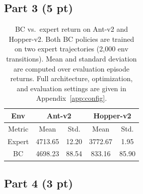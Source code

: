 \documentclass{article}
\begin{document}
\subsection{Part 3 (5 pt)}
\begin{table}[htbp]
  \centering

  \begin{tabular}{ccccc}
    \toprule
    Env & \multicolumn{2}{c}{Ant-v2} & \multicolumn{2}{c}{Hopper-v2} \\
    \midrule
    Metric & Mean & Std. & Mean & Std. \\
    Expert & 4713.65 & 12.20 & 3772.67 & 1.95 \\
    BC & 4698.23 & 88.54 & 833.16 & 85.90 \\
    \bottomrule
  \end{tabular}
    \caption{BC vs.\ expert return on Ant-v2 and Hopper-v2.
Both BC policies are trained on two expert trajectories (2,000 env transitions). Mean and standard deviation are computed over
evaluation episode returns. Full architecture, optimization, and evaluation
settings are given in Appendix~\ref{app:config}.}
  \label{tab:p3}
\end{table}


\subsection{Part 4 (3 pt)}
\end{document}
